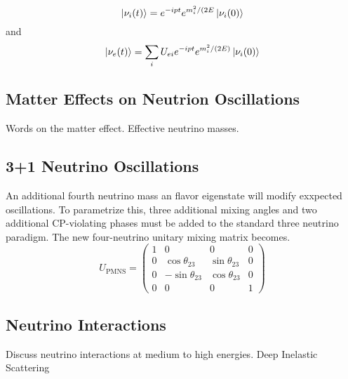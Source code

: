 \documentclass[main.tex]{subfiles}
\begin{document}
\begin{equation}
    \left| \nu_{i} (t) \right >  =  e^{-ipt}e^{ m_{i}^{2}/(2E}\left| \nu_{i} (0) \right >
\end{equation}
and 
\begin{equation}
\left| \nu_{e}(t) \right > = \sum\limits_{i} U_{ei} e^{-ipt}e^{ m_{i}^{2}/(2E)}\left| \nu_{i} (0) \right >
\end{equation}

\subsection{Matter Effects on Neutrion Oscillations}
Words on the matter effect.  Effective neutrino masses. 

\subsection{3+1 Neutrino Oscillations}
An additional fourth neutrino mass an flavor eigenstate will modify exxpected oscillations. To parametrize this, three additional mixing angles and two additional CP-violating phases must be added to the standard three neutrino paradigm. The new four-neutrino unitary mixing matrix becomes.
\begin{equation}
    U_{\text{PMNS}} = \left(\begin{array}{cccc} 1 & 0 & 0 & 0 \\ 0&\cos\theta_{23}&\sin\theta_{23}&0 \\ 0&-\sin\theta_{23}&\cos\theta_{23}&0 \\ 0&0&0&1 \end{array}\right)
\end{equation}

\subsection{Neutrino Interactions}
Discuss neutrino interactions at medium to high energies. Deep Inelastic Scattering
\end{document}
